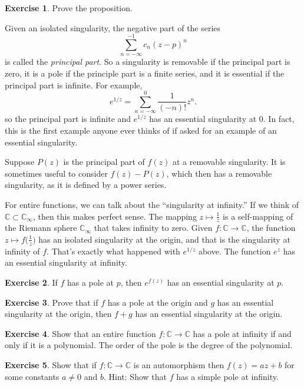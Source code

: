 \documentclass[12pt,openany]{book}
\newcommand{\C}{{\mathbb{C}}}
\newcommand{\myindex}[1]{#1\index{#1}}
\theoremstyle{plain}
\theoremstyle{remark}
\theoremstyle{definition}
\newenvironment{exbox}{%
    \def\FrameCommand{\vrule width 1pt \relax\hspace {10pt}}%
    \MakeFramed {\advance \hsize -\width \FrameRestore }%
}{%
    \endMakeFramed
}
\theoremstyle{exercise}
\newtheorem{exercise}{Exercise}[section]
\theoremstyle{example}
\begin{document}
\begin{exbox}
\begin{exercise}
Prove the proposition.
\end{exercise}
\end{exbox}

Given an isolated singularity, the negative part of the series
\begin{equation*}
\sum_{n=-\infty}^{-1} c_n {(z-p)}^n 
\end{equation*}
is called the \emph{\myindex{principal part}}.  So a singularity is
removable if the principal part is zero, it is a pole if the principle part
is a finite series, and it is essential if the principal part is infinite.
For example,
\begin{equation*}
e^{1/z}
=
\sum_{n=-\infty}^0 \frac{1}{(-n)!} z^n .
\end{equation*}
so the principal part is infinite and $e^{1/z}$ has an essential
singularity at $0$.  In fact, this is the first example anyone ever thinks of
if asked for an example of an essential singularity.

Suppose $P(z)$ is the principal part of $f(z)$ at a removable singularity.
It is sometimes useful to consider $f(z)-P(z)$, which then has a removable
singularity, as it is defined by a power series.

\medskip

For entire functions, we can talk about the ``singularity at infinity.''
If we think of $\C \subset \C_\infty$, then this makes perfect sense.
The mapping $z \mapsto \frac{1}{z}$ is a self-mapping of the Riemann
sphere $\C_\infty$ that takes infinity to zero.  Given $f \colon \C \to
\C$, the function $z \mapsto f\bigl( \frac{1}{z} \bigr)$ has an isolated
singularity at the origin, and that is the singularity at infinity
of $f$.  That's exactly what happened with $e^{1/z}$ above.  The function
$e^z$ has an essential singularity at infinity.

\begin{exbox}
\begin{exercise}
If $f$ has a pole at $p$, then $e^{f(z)}$ has an essential singularity at
$p$.
\end{exercise}

\begin{exercise}
Prove that if $f$ has a pole at the origin and $g$ has an essential
singularity at the origin, then $f+g$ has an essential singularity at the
origin.
\end{exercise}

\begin{exercise}
Show that an entire function $f \colon \C \to \C$ has a pole at infinity
if and only if it is a polynomial.  The order of the pole is the degree of
the polynomial.
\end{exercise}

\begin{exercise}
Show that if $f \colon \C \to \C$ is an automorphism then
$f(z) = az + b$ for
some constants $a \not= 0$ and $b$.  Hint: Show that $f$ has a simple pole at
infinity.
\end{exercise}
\end{exbox}
\end{document}
